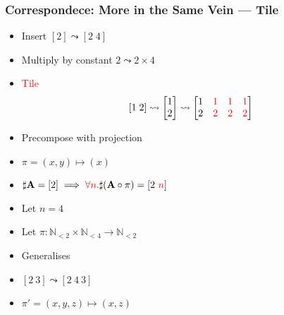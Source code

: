 \documentclass[xetex,mathserif,serif]{beamer}
\newcommand\mrm[1]{\mathrm{#1}}
\newcommand\brm[1]{\bm{\mrm{#1}}}
\newcommand\Nat{\mathbb{N}}
\newcommand\NB[1]{\textcolor{red}{#1}}
\begin{document}
\begin{frame}
  \frametitle{Correspondece: More in the Same Vein --- Tile}
  \pause
  \begin{itemize}[<+->]
    \item Insert \([2] \leadsto [2\;4]\)
    \item Multiply by constant \(2\leadsto 2\times 4\)
    \item \NB{Tile} \[
      [1\;2]\leadsto
      \begin{bmatrix} 1 \\ 2 \end{bmatrix}\leadsto
      \begin{bmatrix} 1 & \NB 1 & \NB 1 & \NB  1 \\ 2 & \NB 2 & \NB 2 & \NB 2 \end{bmatrix}
    \]
    \item Precompose with projection
    \item \(\pi = (x, y) \mapsto (x)\)
    \item \(\sharp \brm A = [2] \implies \NB{\forall n.} \sharp(\brm A \circ \pi) = [2\ \NB n]\)
    \item Let \(n = 4\)
    \item Let \(\pi : \Nat_{<2} \times \Nat_{<4} \to \Nat_{<2}\)
    \item Generalises
    \item \([2\ 3] \leadsto [2\ 4\ 3]\)
    \item \(\pi' = (x, y, z) \mapsto (x, z)\)
  \end{itemize}
\end{frame}
\end{document}
